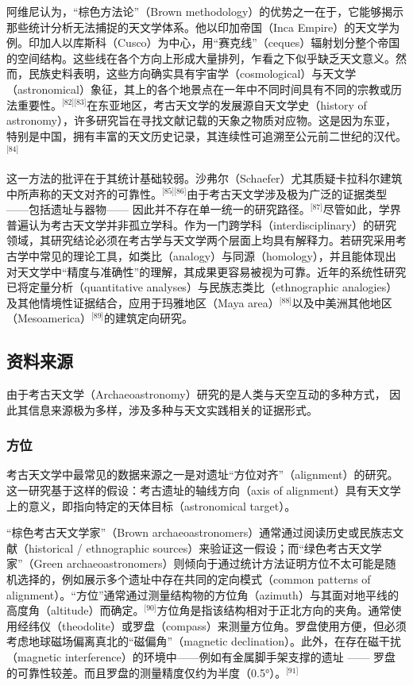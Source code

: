 阿维尼认为，“棕色方法论”（Brown methodology）的优势之一在于，它能够揭示那些统计分析无法捕捉的天文学体系。他以印加帝国（Inca Empire）的天文学为例。印加人以库斯科（Cusco）为中心，用“赛克线”（ceques）辐射划分整个帝国的空间结构。这些线在各个方向上形成大量排列，乍看之下似乎缺乏天文意义。然而，民族史料表明，这些方向确实具有宇宙学（cosmological）与天文学（astronomical）象征，其上的各个地景点在一年中不同时间具有不同的宗教或历法重要性。\(^\text{[82][83]}\)在东亚地区，考古天文学的发展源自天文学史（history of astronomy），许多研究旨在寻找文献记载的天象之物质对应物。这是因为东亚，特别是中国，拥有丰富的天文历史记录，其连续性可追溯至公元前二世纪的汉代。\(^\text{[84]}\)

这一方法的批评在于其统计基础较弱。沙弗尔（Schaefer）尤其质疑卡拉科尔建筑中所声称的天文对齐的可靠性。\(^\text{[85][86]}\)由于考古天文学涉及极为广泛的证据类型——包括遗址与器物—— 因此并不存在单一统一的研究路径。\(^\text{[87]}\)尽管如此，学界普遍认为考古天文学并非孤立学科。作为一门跨学科（interdisciplinary）的研究领域，其研究结论必须在考古学与天文学两个层面上均具有解释力。若研究采用考古学中常见的理论工具，如类比（analogy）与同源（homology），并且能体现出对天文学中“精度与准确性”的理解，其成果更容易被视为可靠。近年的系统性研究已将定量分析（quantitative analyses）与民族志类比（ethnographic analogies）及其他情境性证据结合，应用于玛雅地区（Maya area）\(^\text{[88]}\)以及中美洲其他地区（Mesoamerica）\(^\text{[89]}\)的建筑定向研究。
\subsection{资料来源}
由于考古天文学（Archaeoastronomy）研究的是人类与天空互动的多种方式，  
因此其信息来源极为多样，涉及多种与天文实践相关的证据形式。
\subsubsection{方位}
考古天文学中最常见的数据来源之一是对遗址“方位对齐”（alignment）的研究。这一研究基于这样的假设：考古遗址的轴线方向（axis of alignment）具有天文学上的意义，即指向特定的天体目标（astronomical target）。  

“棕色考古天文学家”（Brown archaeoastronomers）通常通过阅读历史或民族志文献（historical / ethnographic sources）来验证这一假设；而“绿色考古天文学家”（Green archaeoastronomers）则倾向于通过统计方法证明方位不太可能是随机选择的，例如展示多个遗址中存在共同的定向模式（common patterns of alignment）。“方位”通常通过测量结构物的方位角（azimuth）与其面对地平线的高度角（altitude）而确定。\(^\text{[90]}\)方位角是指该结构相对于正北方向的夹角。通常使用经纬仪（theodolite）或罗盘（compass）来测量方位角。罗盘使用方便，但必须考虑地球磁场偏离真北的“磁偏角”（magnetic declination）。此外，在存在磁干扰（magnetic interference）的环境中——例如有金属脚手架支撑的遗址 —— 罗盘的可靠性较差。而且罗盘的测量精度仅约为半度（0.5°）。\(^\text{[91]}\)


